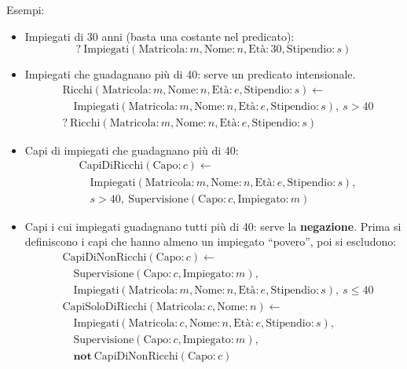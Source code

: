 \documentclass[12pt]{extarticle}
\begin{document}
\medskip
\noindent Esempi:
\begin{itemize}
    \item Impiegati di 30 anni (basta una costante nel predicato):
    \[
    ?\ \text{Impiegati}(\text{Matricola}: m, \text{Nome}: n, \text{Età}: 30, \text{Stipendio}: s)
    \]
    \item Impiegati che guadagnano più di 40: serve un predicato intensionale.
    \[
    \begin{aligned}
    & \text{Ricchi}(\text{Matricola}: m, \text{Nome}: n, \text{Età}: e, \text{Stipendio}: s) \leftarrow \\
    & \quad \text{Impiegati}(\text{Matricola}: m, \text{Nome}: n, \text{Età}: e, \text{Stipendio}: s),\ s > 40 \\[4pt]
    & ?\ \text{Ricchi}(\text{Matricola}: m, \text{Nome}: n, \text{Età}: e, \text{Stipendio}: s)
    \end{aligned}
    \]
    \item Capi di impiegati che guadagnano più di 40:
    \[
    \begin{aligned}
    & \text{CapiDiRicchi}(\text{Capo}: c) \leftarrow \\
    & \quad \text{Impiegati}(\text{Matricola}: m, \text{Nome}: n, \text{Età}: e, \text{Stipendio}: s), \\
    & \quad s > 40,\ \text{Supervisione}(\text{Capo}: c, \text{Impiegato}: m)
    \end{aligned}
    \]
    \item Capi i cui impiegati guadagnano tutti più di 40: serve la \textbf{negazione}. Prima si definiscono i capi che hanno almeno un impiegato ``povero'', poi si escludono:
    \[\begin{aligned}     & \text{CapiDiNonRicchi}(\text{Capo}: c) \leftarrow \\     & \quad \text{Supervisione}(\text{Capo}: c, \text{Impiegato}: m), \\     & \quad \text{Impiegati}(\text{Matricola}: m, \text{Nome}: n, \text{Età}: e, \text{Stipendio}: s),\ s \leq 40 \\     & \text{CapiSoloDiRicchi}(\text{Matricola}: c, \text{Nome}: n) \leftarrow \\     & \quad \text{Impiegati}(\text{Matricola}: c, \text{Nome}: n, \text{Età}: e, \text{Stipendio}: s), \\     & \quad \text{Supervisione}(\text{Capo}: c, \text{Impiegato}: m), \\     & \quad \textbf{not}\ \text{CapiDiNonRicchi}(\text{Capo}: c)     \end{aligned}\]

\end{itemize}
\end{document}
